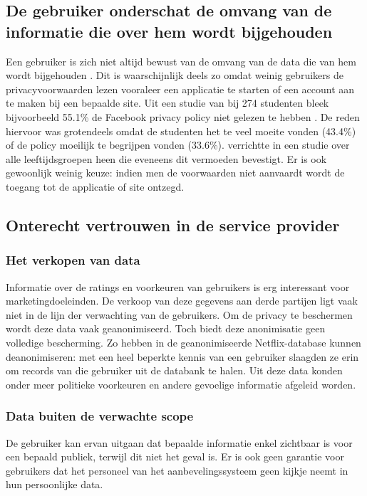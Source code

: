 \subsection{De gebruiker onderschat de omvang van de informatie die over hem wordt bijgehouden}
Een gebruiker is zich niet altijd bewust van de omvang van de data die van hem wordt bijgehouden \cite{pirs}. Dit is waarschijnlijk deels zo omdat weinig gebruikers de privacyvoorwaarden lezen vooraleer een applicatie te starten of een account aan te maken bij een bepaalde site. Uit een studie van \citeauthor{privdisc} bij 274 studenten bleek bijvoorbeeld 55.1\% de Facebook privacy policy niet gelezen te hebben \cite{privdisc}. De reden hiervoor was grotendeels omdat de studenten het te veel moeite vonden (43.4\%) of de policy moeilijk te begrijpen vonden (33.6\%). \citeauthor{hoofnagle} verrichtte in \cite{hoofnagle} een studie over alle leeftijdsgroepen heen die eveneens dit vermoeden bevestigt. Er is ook gewoonlijk weinig keuze: indien men de voorwaarden niet aanvaardt wordt de toegang tot de applicatie of site ontzegd.
\subsection{Onterecht vertrouwen in de service provider}
\label{onterecht_vertrouwen}

\subsubsection{Het verkopen van data}
Informatie over de ratings en voorkeuren van gebruikers is erg interessant voor marketingdoeleinden. De verkoop van deze gegevens aan derde partijen ligt vaak niet in de lijn der verwachting van de gebruikers. Om de privacy te beschermen wordt deze data vaak geanonimiseerd. Toch biedt deze anonimisatie geen volledige bescherming. Zo hebben \citeauthor{Narayanan2008} in \cite{Narayanan2008} de geanonimiseerde Netflix-database kunnen deanonimiseren: met een heel beperkte kennis van een gebruiker slaagden ze erin om records van die gebruiker uit de databank te halen. Uit deze data konden onder meer politieke voorkeuren en andere gevoelige informatie afgeleid worden.

\subsubsection{Data buiten de verwachte scope \cite{pirs}}
De gebruiker kan ervan uitgaan dat bepaalde informatie enkel zichtbaar is voor een bepaald publiek, terwijl dit niet het geval is. Er is ook geen garantie voor gebruikers dat het personeel van het aanbevelingssysteem geen kijkje neemt in hun persoonlijke data.\\

